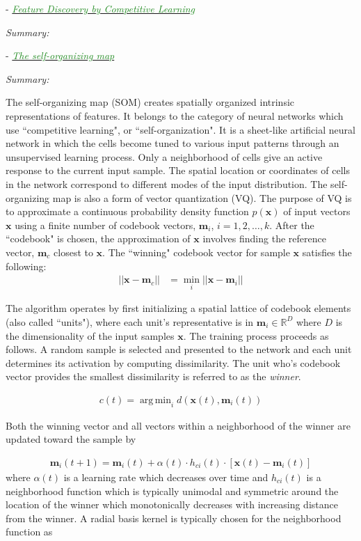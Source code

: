 \documentclass[]{article}
\DeclareMathOperator*{\argmin}{arg\,min}
\newcommand{\paperentry}[4]{
            \hangindent=1cm
            \cite{#1} - \href{run:../References/#3}{\textcolor{ForestGreen}{\textit{#2}}}
            
            \noindent            
            \begin{minipage}[t]{0.1\linewidth}\hfill\end{minipage}
            \begin{minipage}[t]{0.8\linewidth}\textcolor{NavyBlue}{{\textit{Summary:}}}#4\end{minipage}
            \vspace{.25cm}
          }
\begin{document}
	\paperentry
	{Rumelhart1985CHL}
	{Feature Discovery by Competitive Learning}
	{Manifold_Representation_Learning/CHL/Rumelhart1985CHL.pdf}
	{}
	
	\paperentry{Kohonen1990SOM}
	{The self-organizing map}
	{Manifold_Representation_Learning/CHL/Kohonen1990SOM.pdf}
	{}
	\newline
	The self-organizing map (SOM) creates spatially organized intrinsic representations of features.  It belongs to the category of neural networks which use ``competitive learning", or ``self-organization".  It is a sheet-like artificial neural network in which the cells become tuned to various input patterns through an unsupervised learning process.  Only a neighborhood of cells give an active response to the current input sample.  The spatial location or coordinates of cells in the network correspond to different modes of the input distribution. The self-organizing map is also a form of vector quantization (VQ).  The purpose of VQ is to approximate a continuous probability density function $p(\bm{x})$ of input vectors $\bm{x}$ using a finite number of codebook vectors, $\bm{m}_i$, $i=1,2,\dots,k$.  After the ``codebook" is chosen, the approximation of $\bm{x}$ involves finding the reference vector, $\bm{m}_c$ closest to $\bm{x}$.  The ``winning" codebook vector for sample $\bm{x}$ satisfies the following:
	\begin{align*}
		|| \bm{x} - \bm{m}_c|| &= \min_{i}|| \bm{x} - \bm{m}_{i} ||
	\end{align*}	
	\noindent
	
	The algorithm operates by first initializing a spatial lattice of codebook elements (also called ``units"), where each unit's representative is in $\bm{m}_i \in \mathbb{R}^{D}$ where $D$ is the dimensionality of the input samples $\bm{x}$.  The training process proceeds as follows.  A random sample is selected and presented to the network and each unit determines its activation by computing dissimilarity.	 The unit who's codebook vector provides the smallest dissimilarity is referred to as the \textit{winner}.
	
	\begin{align*}
		c(t) = \argmin_{i} d(\bm{x}(t),\bm{m}_{i}(t))
	\end{align*}
	\noindent
	
	Both the winning vector and all vectors within a neighborhood of the winner are updated toward the sample by 
	
	\begin{align*}
		\bm{m}_{i}(t+1) = \bm{m}_{i}(t) + \alpha(t) \cdot h_{ci}(t) \cdot [ \bm{x}(t) - \bm{m}_{i}(t) ] 
	\end{align*}
	\noindent
	where $\alpha(t)$ is a learning rate which decreases over time and $h_{ci}(t)$ is a neighborhood function which is typically unimodal and symmetric around the location of the winner which monotonically decreases with increasing distance from the winner.  A radial basis kernel is typically chosen for the neighborhood function as 
	
\end{document}
